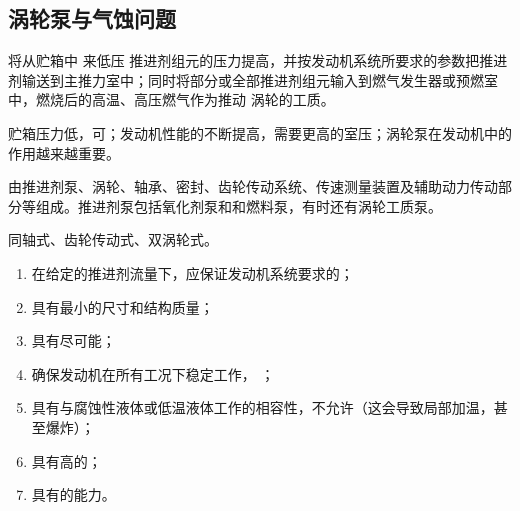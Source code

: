 \subsection{涡轮泵与气蚀问题}

\sssection[涡轮泵功能及组成]


\blue[功能] \quad 将从贮箱中 来低压 推进剂组元的压力提高，并按发动机系统所要求的参数把推进剂输送到主推力室中；同时将部分或全部推进剂组元输入到燃气发生器或预燃室中，燃烧后的高温、高压燃气作为推动
涡轮的工质。

\blue[重要性] \quad 贮箱压力低，可\red[大大减轻结构质量]；发动机性能的不断提高，需要更高的室压；涡轮泵在发动机中的作用越来越重要。

\blue[组成] \quad 由推进剂泵、涡轮、轴承、密封、齿轮传动系统、传速测量装置及辅助动力传动部分等组成。推进剂泵包括氧化剂泵和和燃料泵，有时还有涡轮工质泵。

\blue[涡轮和泵的传动和配置方式] \quad 同轴式、齿轮传动式、双涡轮式。
\vspace*{0.2em}

\blue[对涡轮泵的要求] 
\vspace*{-0.5em}
\begin{enumerate}[\hspace*{3em} $\bigstar$]
	\item 在给定的推进剂流量下，应保证发动机系统要求的\red[出口压力值]；\vspace*{-0.5em}
	\item 具有最小的尺寸和结构质量；\vspace*{-0.5em}
	\item 具有尽可能\red[高的效率]；\vspace*{-0.5em}
	\item 确保发动机在所有工况下稳定工作， \red[压力脉动与机械振动很小]；\vspace*{-0.5em}
	\item 具有与腐蚀性液体或低温液体工作的相容性，不允许\red[氧化剂泵零件间有摩擦]（这会导致局部加温，甚至爆炸）；\vspace*{-0.5em}
	\item 具有高的\red[抗气蚀性能]；\vspace*{-0.5em}
	\item 具有\red[抽吸含少量气体或蒸汽的推进剂]的能力。\vspace*{-0.5em}
\end{enumerate}

















